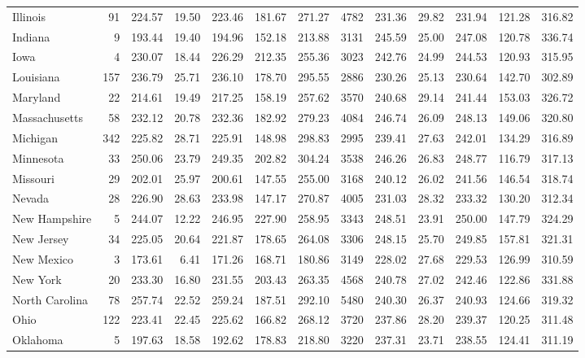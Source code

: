 \begin{sidewaystable}[htb]
\begin{center}
{\begin{tabular}{lrrrrrr@{\extracolsep{10pt}}rrrrrr}
  Illinois &  91 & 224.57 & 19.50 & 223.46 & 181.67 & 271.27 & 4782 & 231.36 & 29.82 & 231.94 & 121.28 & 316.82 \\ 
  Indiana &   9 & 193.44 & 19.40 & 194.96 & 152.18 & 213.88 & 3131 & 245.59 & 25.00 & 247.08 & 120.78 & 336.74 \\ 
  Iowa &   4 & 230.07 & 18.44 & 226.29 & 212.35 & 255.36 & 3023 & 242.76 & 24.99 & 244.53 & 120.93 & 315.95 \\ 
  Louisiana & 157 & 236.79 & 25.71 & 236.10 & 178.70 & 295.55 & 2886 & 230.26 & 25.13 & 230.64 & 142.70 & 302.89 \\ 
  Maryland &  22 & 214.61 & 19.49 & 217.25 & 158.19 & 257.62 & 3570 & 240.68 & 29.14 & 241.44 & 153.03 & 326.72 \\ 
  Massachusetts &  58 & 232.12 & 20.78 & 232.36 & 182.92 & 279.23 & 4084 & 246.74 & 26.09 & 248.13 & 149.06 & 320.80 \\ 
  Michigan & 342 & 225.82 & 28.71 & 225.91 & 148.98 & 298.83 & 2995 & 239.41 & 27.63 & 242.01 & 134.29 & 316.89 \\ 
  Minnesota &  33 & 250.06 & 23.79 & 249.35 & 202.82 & 304.24 & 3538 & 246.26 & 26.83 & 248.77 & 116.79 & 317.13 \\ 
  Missouri &  29 & 202.01 & 25.97 & 200.61 & 147.55 & 255.00 & 3168 & 240.12 & 26.02 & 241.56 & 146.54 & 318.74 \\ 
  Nevada &  28 & 226.90 & 28.63 & 233.98 & 147.17 & 270.87 & 4005 & 231.03 & 28.32 & 233.32 & 130.20 & 312.34 \\ 
  New Hampshire &   5 & 244.07 & 12.22 & 246.95 & 227.90 & 258.95 & 3343 & 248.51 & 23.91 & 250.00 & 147.79 & 324.29 \\ 
  New Jersey &  34 & 225.05 & 20.64 & 221.87 & 178.65 & 264.08 & 3306 & 248.15 & 25.70 & 249.85 & 157.81 & 321.31 \\ 
  New Mexico &   3 & 173.61 & 6.41 & 171.26 & 168.71 & 180.86 & 3149 & 228.02 & 27.68 & 229.53 & 126.99 & 310.59 \\ 
  New York &  20 & 233.30 & 16.80 & 231.55 & 203.43 & 263.35 & 4568 & 240.78 & 27.02 & 242.46 & 122.86 & 331.88 \\ 
  North Carolina &  78 & 257.74 & 22.52 & 259.24 & 187.51 & 292.10 & 5480 & 240.30 & 26.37 & 240.93 & 124.66 & 319.32 \\ 
  Ohio & 122 & 223.41 & 22.45 & 225.62 & 166.82 & 268.12 & 3720 & 237.86 & 28.20 & 239.37 & 120.25 & 311.48 \\ 
  Oklahoma &   5 & 197.63 & 18.58 & 192.62 & 178.83 & 218.80 & 3220 & 237.31 & 23.71 & 238.55 & 124.41 & 311.19 \\ 

\end{tabular}}
\end{center}
\end{sidewaystable}

